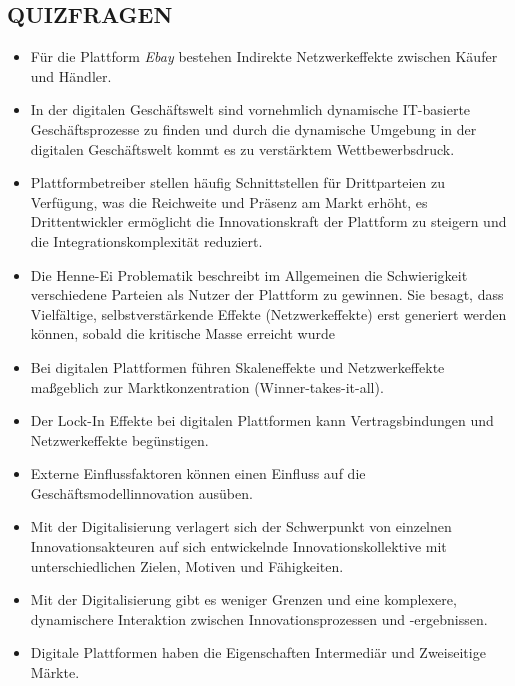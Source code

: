 \documentclass[12pt,a4paper]{article}
\begin{document}
\newpage
\subsection{QUIZFRAGEN} %
\begin{itemize}
   \item Für die Plattform \emph{Ebay} bestehen Indirekte Netzwerkeffekte zwischen Käufer und Händler.
   
   \item In der digitalen Geschäftswelt sind vornehmlich dynamische IT-basierte Geschäftsprozesse zu finden und durch die dynamische Umgebung in der digitalen Geschäftswelt kommt es zu verstärktem Wettbewerbsdruck.
   
   \item Plattformbetreiber stellen häufig Schnittstellen für Drittparteien zu Verfügung, was die Reichweite und Präsenz am Markt erhöht, es Drittentwickler ermöglicht die Innovationskraft der Plattform zu steigern und die Integrationskomplexität reduziert.
   
   \item Die Henne-Ei Problematik beschreibt im Allgemeinen die Schwierigkeit verschiedene Parteien als Nutzer der Plattform zu gewinnen.
         Sie besagt, dass Vielfältige, selbst\-ver\-stärk\-en\-de Effekte (Netzwerkeffekte) erst generiert werden können, sobald die kritische Masse erreicht wurde
   
   \item Bei digitalen Plattformen führen Skaleneffekte und Netzwerkeffekte maßgeblich zur Marktkonzentration (Winner-takes-it-all).
   
   \item Der Lock-In Effekte bei digitalen Plattformen kann Vertragsbindungen und Netzwerkeffekte begünstigen.
   
   \item Externe Einflussfaktoren können einen Einfluss auf die Geschäftsmodellinnovation ausüben.
   \item Mit der Digitalisierung verlagert sich der Schwerpunkt von einzelnen Innovationsakteuren auf sich entwickelnde Innovationskollektive mit unterschiedlichen Zielen, Motiven und Fähigkeiten.
   \item Mit der Digitalisierung gibt es weniger Grenzen und eine komplexere, dynamischere Interaktion zwischen Innovationsprozessen und -ergebnissen.
   
   \item Digitale Plattformen haben die Eigenschaften Intermediär und Zweiseitige Märkte.
\end{itemize}
\end{document}
